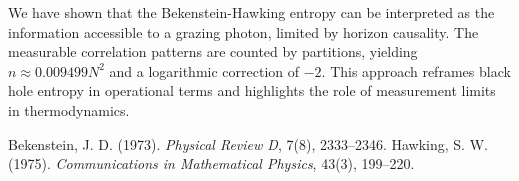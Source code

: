 \documentclass[12pt, letterpaper]{article}
\begin{document}
We have shown that the Bekenstein-Hawking entropy can be interpreted as the information accessible to a grazing photon, limited by horizon causality. The measurable correlation patterns are counted by partitions, yielding $n \approx 0.009499 N^2$ and a logarithmic correction of $-2$. This approach reframes black hole entropy in operational terms and highlights the role of measurement limits in thermodynamics.

\begin{thebibliography}{9}
 Bekenstein, J. D. (1973). \textit{Physical Review D}, 7(8), 2333–2346.
 Hawking, S. W. (1975). \textit{Communications in Mathematical Physics}, 43(3), 199–220.
\end{thebibliography}
\end{document}
